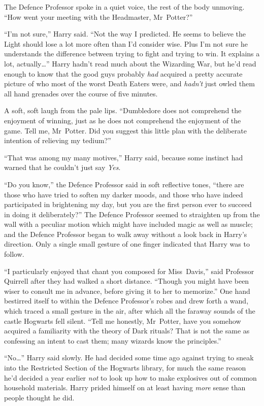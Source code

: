 The Defence Professor spoke in a quiet voice, the rest of the body unmoving. “How went your meeting with the Headmaster, Mr~Potter?”

“I’m not sure,” Harry said. “Not the way I predicted. He seems to believe the Light should lose a lot more often than I’d consider wise. Plus I’m not sure he understands the difference between trying to fight and trying to win. It explains a lot, actually…” Harry hadn’t read much about the Wizarding War, but he’d read enough to know that the good guys probably \emph{had} acquired a pretty accurate picture of who most of the worst Death Eaters were, and \emph{hadn’t} just owled them all hand grenades over the course of five minutes.

A soft, soft laugh from the pale lips. “Dumbledore does not comprehend the enjoyment of winning, just as he does not comprehend the enjoyment of the game. Tell me, Mr~Potter. Did you suggest this little plan with the deliberate intention of relieving my tedium?”

“That was among my many motives,” Harry said, because some instinct had warned that he couldn’t just say \emph{Yes}.

“Do you know,” the Defence Professor said in soft reflective tones, “there are those who have tried to soften my darker moods, and those who have indeed participated in brightening my day, but you are the first person ever to succeed in doing it deliberately?” The Defence Professor seemed to straighten up from the wall with a peculiar motion which might have included magic as well as muscle; and the Defence Professor began to walk away without a look back in Harry’s direction. Only a single small gesture of one finger indicated that Harry was to follow.

“I particularly enjoyed that chant you composed for Miss~Davis,” said Professor Quirrell after they had walked a short distance. “Though you might have been wiser to consult me in advance, before giving it to her to memorize.” One hand bestirred itself to within the Defence Professor’s robes and drew forth a wand, which traced a small gesture in the air, after which all the faraway sounds of the castle Hogwarts fell silent. “Tell me honestly, Mr~Potter, have you somehow acquired a familiarity with the theory of Dark rituals? That is not the same as confessing an intent to cast them; many wizards know the principles.”

“No…” Harry said slowly. He had decided some time ago against trying to sneak into the Restricted Section of the Hogwarts library, for much the same reason he’d decided a year earlier \emph{not} to look up how to make explosives out of common household materials. Harry prided himself on at least having \emph{more} sense than people thought he did.

